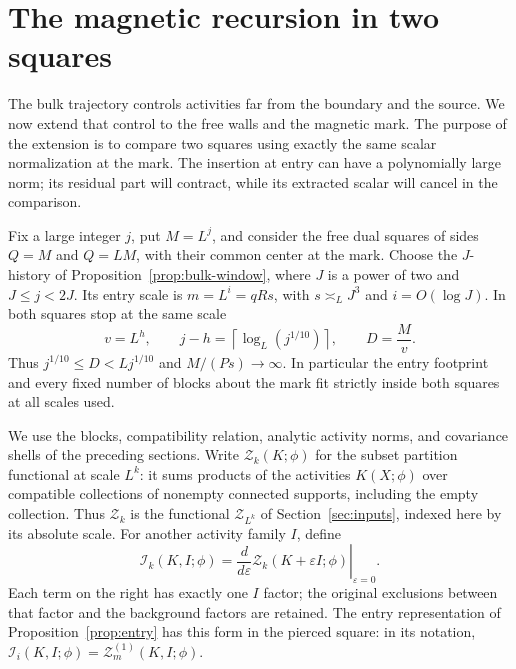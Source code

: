 \section{The magnetic recursion in two squares}\label{sec:magnetic}

The bulk trajectory controls activities far from the boundary and the
source.  We now extend that control to the free walls and the magnetic
mark.  The purpose of the extension is to compare two squares using
exactly the same scalar normalization at the mark.  The insertion at
entry can have a polynomially large norm; its residual part will
contract, while its extracted scalar will cancel in the comparison.

Fix a large integer $j$, put $M=L^j$, and consider the free dual
squares of sides $Q=M$ and $Q=LM$, with their common center at the
mark.  Choose the $J$-history of Proposition~\ref{prop:bulk-window},
where $J$ is a power of two and $J\le j<2J$.  Its entry scale is
$m=L^i=qRs$, with $s\asymp_L J^3$ and $i=O(\log J)$.
In both squares stop at the same scale
\begin{equation}\label{eq:mag-common-stop}
 v=L^h,\qquad
 j-h=\left\lceil\log_L(j^{1/10})\right\rceil,
 \qquad D=\frac{M}{v}.
\end{equation}
Thus $j^{1/10}\le D<Lj^{1/10}$ and $M/(Ps)\to\infty$.
In particular the entry footprint and every fixed number of blocks
about the mark fit strictly inside both squares at all scales used.

We use the blocks, compatibility relation, analytic activity norms,
and covariance shells of the preceding sections.  Write
$\mathscr Z_k(K;\phi)$ for the subset partition functional at scale
$L^k$: it sums products of the activities $K(X;\phi)$ over compatible
collections of nonempty connected supports, including the empty
collection.  Thus $\mathscr Z_k$ is the functional
$\mathcal Z_{L^k}$ of Section~\ref{sec:inputs}, indexed here by its
absolute scale.  For another activity family $I$, define
\begin{equation}\label{eq:mag-first-variation}
 \mathscr I_k(K,I;\phi)
 =\left.\frac{d}{d\varepsilon}
       \mathscr Z_k(K+\varepsilon I;\phi)\right|_{\varepsilon=0}.
\end{equation}
Each term on the right has exactly one $I$ factor; the original
exclusions between that factor and the background factors are
retained.  The entry representation of Proposition~\ref{prop:entry}
has this form in the pierced square: in its notation,
$\mathscr I_i(K,I;\phi)=\mathcal Z_m^{(1)}(K,I;\phi)$.

